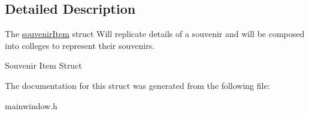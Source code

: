 \subsection{Detailed Description}
The \mbox{\hyperlink{structsouvenir_item}{souvenir\+Item}} struct Will replicate details of a souvenir and will be composed into colleges to represent their souvenirs. 

Souvenir Item Struct 

The documentation for this struct was generated from the following file\+:\begin{DoxyCompactItemize}
\item 
mainwindow.\+h\end{DoxyCompactItemize}
